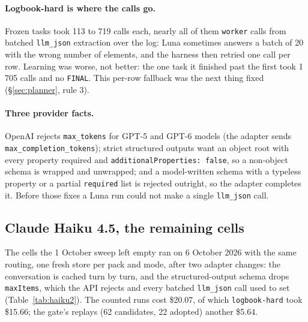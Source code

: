 \documentclass[11pt,a4paper]{article}
\newcommand{\code}[1]{\texttt{#1}}
\begin{document}
\paragraph{Logbook-hard is where the calls go.} Frozen tasks took 113 to 719
calls each, nearly all of them \code{worker} calls from batched
\code{llm\_json} extraction over the log: Luna sometimes answers a batch of 20
with the wrong number of elements, and the harness then retried one call per
row. Learning was worse, not better: the one task it finished past the first
took 1\,705 calls and no \code{FINAL}. This per-row fallback was the next thing
fixed (\S\ref{sec:planner}, rule 3).

\paragraph{Three provider facts.} OpenAI rejects \code{max\_tokens} for GPT-5
and GPT-6 models (the adapter sends \code{max\_completion\_tokens}); strict
structured outputs want an object root with every property required and
\code{additionalProperties: false}, so a non-object schema is wrapped and
unwrapped; and a model-written schema with a typeless property or a partial
\code{required} list is rejected outright, so the adapter completes it.
Before those fixes a Luna run could not make a single \code{llm\_json} call.

\FloatBarrier
\subsection{Claude Haiku 4.5, the remaining cells}
\label{sec:haiku2}

The cells the 1 October sweep left empty ran on 6 October 2026 with the same
routing, one fresh store per pack and mode, after two adapter changes: the
conversation is cached turn by turn, and the structured-output schema drops
\code{maxItems}, which the API rejects and every batched \code{llm\_json} call
used to set (Table~\ref{tab:haiku2}). The counted runs cost \$20.07, of which
\code{logbook-hard} took \$15.66; the gate's replays (62 candidates, 22
adopted) another \$5.64.
\end{document}
